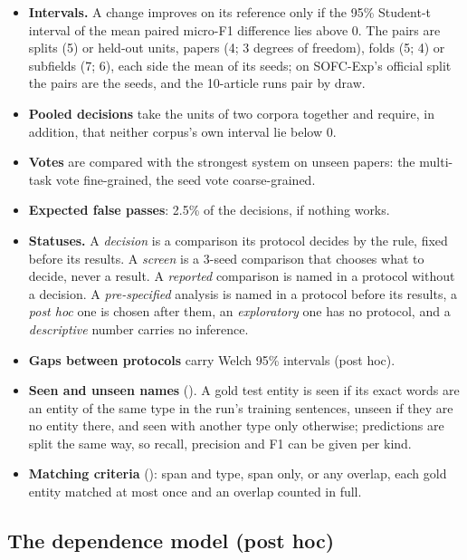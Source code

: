 \documentclass[11pt,a4paper]{article}
\providecommand{\tightlist}{\setlength{\itemsep}{0pt}\setlength{\parskip}{0pt}}
\begin{document}
\begin{itemize}
\tightlist
\item
  \textbf{Intervals.} A change improves on its reference only if the 95\%
  Student-t interval of the mean paired micro-F1 difference lies above 0.
  The pairs are splits (5) or held-out units, papers (4; 3 degrees of
  freedom), folds (5; 4) or subfields (7; 6), each side the mean of its
  seeds; on SOFC-Exp's official split the pairs are the seeds, and the
  10-article runs pair by draw.
\item
  \textbf{Pooled decisions} take the units of two corpora together and require,
  in addition, that neither corpus's own interval lie below 0.
\item
  \textbf{Votes} are compared with the strongest system on unseen papers: the
  multi-task vote fine-grained, the seed vote coarse-grained.
\item
  \textbf{Expected false passes}: 2.5\% of the decisions, if nothing works.
\item
  \textbf{Statuses.} A \emph{decision} is a comparison its protocol decides by the
  rule, fixed before its results. A \emph{screen} is a 3-seed comparison that
  chooses what to decide, never a result. A \emph{reported} comparison is named
  in a protocol without a decision. A \emph{pre-specified} analysis is named in
  a protocol before its results, a \emph{post hoc} one is chosen after them, an
  \emph{exploratory} one has no protocol, and a \emph{descriptive} number carries no
  inference.
\item
  \textbf{Gaps between protocols} carry Welch 95\% intervals (post hoc).
\item
  \textbf{Seen and unseen names} (\citealp{augenstein2017generalisation}). A gold test
  entity is seen if its exact words are an entity of the same type in the
  run's training sentences, unseen if they are no entity there, and seen
  with another type only otherwise; predictions are split the same way, so
  recall, precision and F1 can be given per kind.
\item
  \textbf{Matching criteria} (\citealp{segurabedmar2013semeval}): span and type, span
  only, or any overlap, each gold entity matched at most once and an
  overlap counted in full.
\end{itemize}

\hypertarget{the-dependence-model-post-hoc}{%
\subsection{The dependence model (post hoc)}\label{the-dependence-model-post-hoc}}
\end{document}
